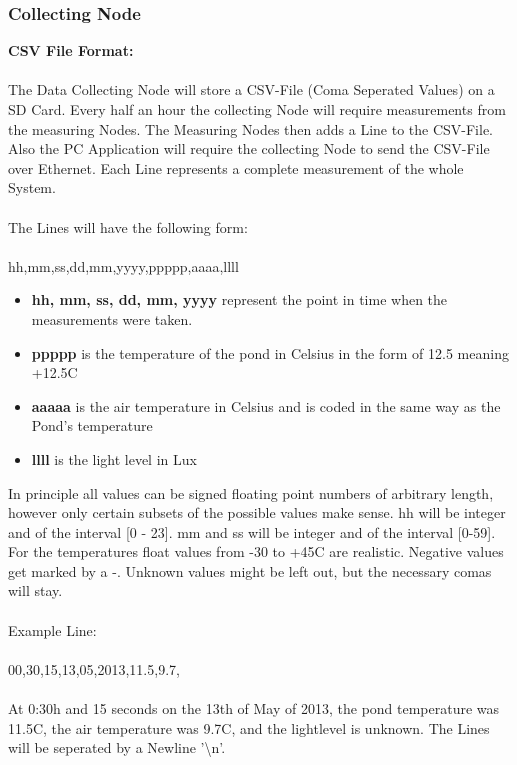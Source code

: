 \documentclass[
	11pt,
	a4paper
]{article}%
\begin{document}
\newpage
\subsubsection{Collecting Node}
\textbf{CSV File Format:}
\\\\
The Data Collecting Node will store a CSV-File (Coma Seperated Values) on a SD Card. Every half an hour the collecting Node will require measurements from the measuring Nodes. The Measuring Nodes then adds a Line to the CSV-File. Also the PC Application will require the collecting Node to send the CSV-File over Ethernet. Each Line represents a complete measurement of the whole System.
\\\\
The Lines will have the following form:
\\\\
hh,mm,ss,dd,mm,yyyy,ppppp,aaaa,llll
\begin{itemize}
\item \textbf{hh, mm, ss, dd, mm, yyyy} represent the point in time when the measurements were taken.
\item \textbf{ppppp} is the temperature of the pond in \degree Celsius in the form of 12.5 meaning +12.5\degree C
\item \textbf{aaaaa} is the air temperature in \degree Celsius and is coded in the same way as the Pond's temperature
\item \textbf{llll} is the light level in Lux
\end{itemize}
In principle all values can be signed floating point numbers of arbitrary length, however only certain subsets of the possible values make sense. hh will be integer and of the interval [0 - 23]. mm and ss will be integer and of the interval [0-59]. For the temperatures float values from -30 to +45\degree C are realistic. Negative values get marked by a -. Unknown values might be left out, but the necessary comas will stay.
\\\\
Example Line:
\\\\
00,30,15,13,05,2013,11.5,9.7,
\\\\
At 0:30h and 15 seconds on the 13th of May of 2013, the pond temperature was 11.5\degree C, the air temperature was 9.7\degree C, and the lightlevel is unknown. The Lines will be seperated by a Newline '\textbackslash n'.
\\\\
\end{document}
